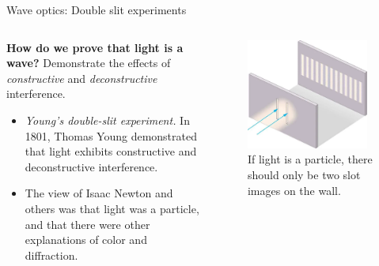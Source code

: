 \documentclass{beamer}
\begin{document}
\begin{frame}{Wave optics: Double slit experiments}
\begin{columns}[T]
\begin{column}{0.5\textwidth}
\small
\textbf{How do we prove that light is a wave?} Demonstrate the effects of \textit{constructive} and \textit{deconstructive} interference.
\begin{itemize}
\item \textit{Young's double-slit experiment.} In 1801, Thomas Young demonstrated that light exhibits constructive and deconstructive interference.
\item The view of Isaac Newton and others was that light was a particle, and that there were other explanations of color and diffraction.
\end{itemize}
\end{column}
\begin{column}{0.5\textwidth}
\begin{figure}
\centering
\includegraphics[width=0.95\textwidth]{figures/slit1.png}
\caption{\label{fig:slit1} \footnotesize If light is a particle, there should only be two slot images on the wall.}
\end{figure}
\end{column}
\end{columns}
\end{frame}
\end{document}
